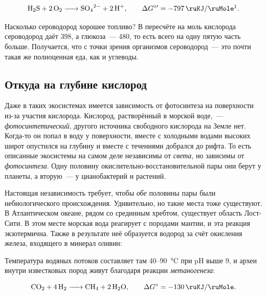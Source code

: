 \begin{equation*}
    \ce{H2S + 2O2 -> SO4^2- + 2H+}, \qquad \Delta G^{\circ\prime} = \qty{-797}{\ruKJ\per\ruMole}\footnotemark.
\end{equation*}


Насколько сероводород хорошее топливо? В пересчёте на моль кислорода сероводород даёт \qty{398}{\ruKJ}, а глюкоза~--- \qty{480}{\ruKJ}, то есть всего на одну пятую часть больше. Получается, что с точки зрения организмов сероводород~--- это почти такая же полноценная еда, как и углеводы.

\subsection*{Откуда на глубине кислород}

Даже в таких экосистемах имеется зависимость от фотосинтеза на поверхности из-за участия кислорода. Кислород, растворённый в морской воде,~--- \emph{фотосинтетический}, другого источника свободного кислорода на Земле нет. Когда-то он попал в воду у поверхности, вместе с холодными водами высоких широт опустился на глубину и вместе с течениями добрался до рифта. То есть описанные экосистемы на самом деле независимы от \emph{света}, но зависимы от \emph{фотосинтеза}. Одну половину окислительно-восстановительной пары они берут у планеты, а вторую~--- у цианобактерий и растений.

Настоящая независимость требует, чтобы \emph{обе} половины пары были небиологического происхождения. Удивительно, но такие места тоже существуют. В Атлантическом океане, рядом со срединным хребтом, существует область Лост-Сити. В этом месте морская вода реагирует с породами мантии, и эта реакция экзотермична. Также в результате неё образуется водород за счёт окисления железа, входящего в минерал оливин:


Температура водяных потоков составляет там \num{40}--\qty{90}{\degreeCelsius} при pH выше \num{9}, и археи внутри известковых пород живут благодаря реакции \emph{метаногенеза}:

\begin{equation*}
    \ce{CO2 + 4H2 -> CH4 + 2H2O}, \qquad \Delta G^{\circ} = \qty{-130}{\ruKJ\per\ruMole}.
\end{equation*}


